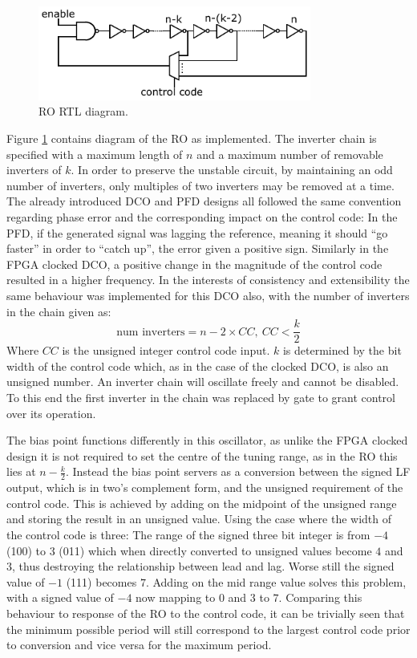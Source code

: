 \begin{figure}[h]
    \centering
    \includegraphics[width=0.8\textwidth]{../ro_new}
    \caption[\acl{RO} RTL diagram]{\acl{RO} RTL diagram.}
    \label{fig:ro_impl}
\end{figure}
Figure \ref{fig:ro_impl} contains  diagram of the \ac{RO} as implemented. The inverter chain is specified with a maximum length of $n$ and a maximum number of removable inverters of $k$. In order to preserve the unstable circuit, by maintaining an odd number of inverters, only multiples of two inverters may be removed at a time. The already introduced \ac{DCO} and \ac{PFD} designs all followed the same convention regarding phase error and the corresponding impact on the control code: In the \ac{PFD}, if the generated signal was lagging the reference, meaning it should ``go faster'' in order to ``catch up'', the error given a positive sign. Similarly in the \ac{FPGA} clocked \ac{DCO}, a positive change in the magnitude of the control code resulted in a higher frequency. In the interests of consistency and extensibility the same behaviour was implemented for this \ac{DCO} also, with the number of inverters in the chain given as:
\begin{equation}
\text{num inverters} = n - 2\times CC,~CC<\frac{k}{2}
\end{equation}
Where $CC$ is the unsigned integer control code input. $k$ is determined by the bit width of the control code which, as in the case of the clocked \ac{DCO}, is also an unsigned number. An inverter chain will oscillate freely and cannot be disabled. To this end the first inverter in the chain was replaced by  gate to grant control over its operation.

The bias point functions differently in this oscillator, as unlike the \ac{FPGA} clocked design it is not required to set the centre of the tuning range, as in the \ac{RO} this lies at $n-\frac{k}{2}$. Instead the bias point servers as a conversion between the signed \ac{LF} output, which is in two's complement form, and the unsigned requirement of the control code. This is achieved by adding on the midpoint of the unsigned range and storing the result in an unsigned value. Using the case where the width of the control code is three: The range of the signed three bit integer is from $-4$ (100) to $3$ (011) which when directly converted to unsigned values become $4$ and $3$, thus destroying the relationship between lead and lag. Worse still the signed value of $-1$ (111) becomes $7$. Adding on the mid range value solves this problem, with a signed value of $-4$ now mapping to $0$ and $3$ to $7$. Comparing this behaviour to response of the \ac{RO} to the control code, it can be trivially seen that the minimum possible period will still correspond to the largest control code prior to conversion and vice versa for the maximum period.

